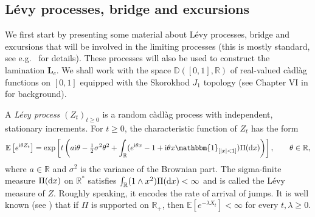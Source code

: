 \documentclass[10pt]{amsart}
\theoremstyle{definition}\newtheorem{defi}[theo]{Definition}\newtheorem{rema}[theo]{Remark}\newtheorem{exam}[theo]{Example}\newtheorem{exem}[theo]{Example}\newtheorem{nota}[theo]{Notation}
\newcommand{\R}{\mathbb{R}}
\newcommand{\D}{\mathbb{D}}
\def\d{{\rm d}}
\newcommand\Es[1]{\mathbb{E}\left[#1\right]}
\begin{document}
\subsection{L\'evy processes, bridge and excursions}
\label{ssec:Levy}
We first start by presenting some material about L\'evy processes, bridge and excursions that will be involved in the limiting processes (this is mostly standard, see e.g.~\cite{Ber96,Kyp06} for details).
These processes will also be used to construct the lamination $\mathbf{L}_{c}$. We shall work with the space ${\D}([0, 1], \R)$ of real-valued c\`adl\`ag functions on $[0,1]$ equipped with the Skorokhod $J_{1}$ topology (see Chapter VI in \cite{JS03} for background).

A \emph{L\'evy process}  $(Z_t)_{t \ge 0}$ is a random c\`adl\`ag process with independent, stationary increments. For $t \geq 0$, the characteristic function of $Z_{t}$ has the form
\[\Es{e^{\textrm{i}\theta Z_{t}}} = \exp\left[ t \left( a\textrm{i} \theta -\tfrac{1}{2}\sigma^2 \theta^2 + \int_{\R}
(e^{\textrm{i}\theta x} -1 +\textrm{i}\theta x \mathbbm{1}_{[|x| <1]}) \Pi({\d}x)\right) \right], \qquad \theta \in \R,\]
where $a \in \R$ and $\sigma^2$ is the variance of the Brownian part.
The sigma-finite measure $\Pi({\d}x)$ on $\R^{*}$ satisfies $\int_{\R} (1 \wedge x^{2}) \Pi({\d}x) < \infty$ and is called the {L\'evy measure} of $Z$. Roughly speaking, it encodes the rate of arrival of jumps. It is well known (see \cite[Theorem 3.6]{Kyp06}) that if $\Pi$ is supported on $\R_{+}$, then $\Es{e^{-\lambda X_{t}}}<\infty$ for every $t, \lambda \geq 0$.
\end{document}
